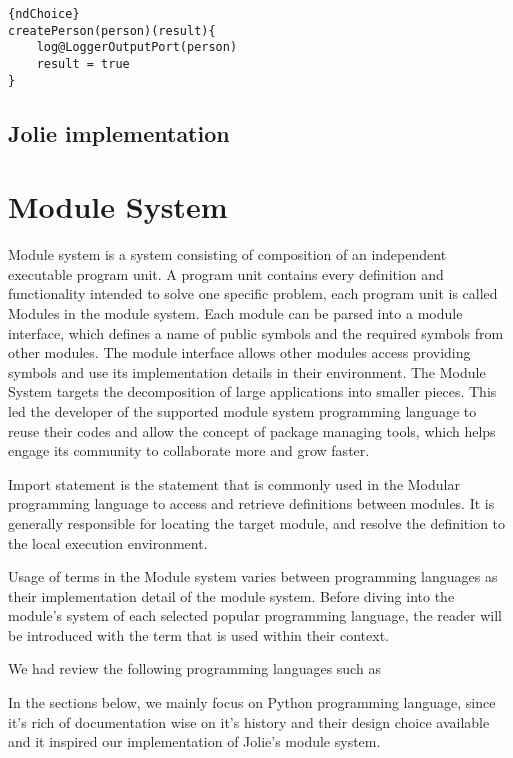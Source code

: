 \begin{listing}[h]
    \lstset{language=Jolie,
        style=codeStyle,
        numbers=left,
        firstnumber=1
    }
    \begin{lstlisting}[frame=tlrb]{ndChoice}
createPerson(person)(result){
    log@LoggerOutputPort(person)
    result = true
}
\end{lstlisting}
\end{listing}

\FloatBarrier




\subsection{Jolie implementation}




\section{Module System}

Module system is a system consisting of composition of an independent executable program unit. A program unit contains every definition and functionality intended to solve one specific problem, each program unit is called Modules in the module system. Each module can be parsed into a module interface, which defines a name of public symbols and the required symbols from other modules. The module interface allows other modules access providing symbols and use its implementation details in their environment. The Module System targets the decomposition of large applications into smaller pieces. This led the developer of the supported module system programming language to reuse their codes and allow the concept of package managing tools, which helps engage its community to collaborate more and grow faster.

Import statement is the statement that is commonly used in the Modular programming language to access and retrieve definitions between modules. It is generally responsible for locating the target module, and resolve the definition to the local execution environment.

Usage of terms in the Module system varies between programming languages as their implementation detail of the module system. Before diving into the module's system of each selected popular programming language, the reader will be introduced with the term that is used within their context.

We had review the following programming languages such as 

In the sections below, we mainly focus on Python programming language, since it's rich of documentation wise on it's history and their design choice available and it inspired our implementation of Jolie's module system.


